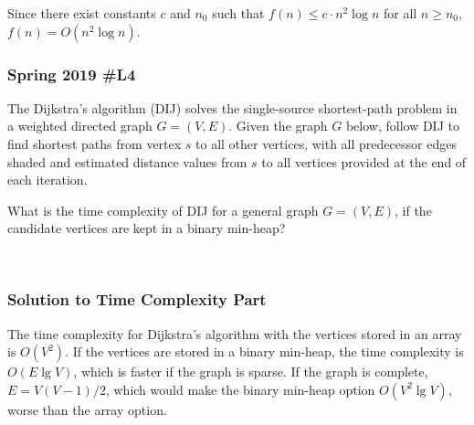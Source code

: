 Since there exist constants $c$ and $n_0$ such that $f(n) \le c \cdot n^2 \log n$ for all $n \ge n_0$, $f(n) = O(n^2 \log n)$.  


\subsubsection{Spring 2019 \#L4}

	The Dijkstra's algorithm (DIJ) solves the single-source shortest-path problem in a weighted directed graph $G=(V,E)$.  Given the graph $G$ below, follow DIJ to find shortest paths from vertex $s$ to all other vertices, with all predecessor edges shaded and estimated distance values from $s$ to all vertices provided at the end of each iteration.  
	
	What is the time complexity of DIJ for a general graph $G=(V,E)$, if the candidate vertices are kept in a binary min-heap?
		
	
\

\hfil {}

\subsubsection{Solution to Time Complexity Part}

The time complexity for Dijkstra's algorithm with the vertices stored in an array is $O(V^2)$.  If the vertices are stored in a binary min-heap, the time complexity is $O(E \lg V)$, which is faster if the graph is sparse.  If the graph is complete, $E = V(V-1)/2$, which would make the binary min-heap option $O(V^2 \lg V)$, worse than the array option.  

